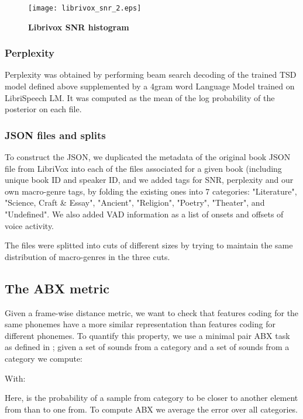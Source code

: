 \documentclass{article}
\begin{document}
\begin{figure}[h]
  \centering
  \centerline{\texttt{[image: librivox\_snr\_2.eps]}}
  \vspace{-1.3mm}
\caption{\textbf{Librivox SNR histogram}}
\label{fig:librivox_snr}
\end{figure}

\subsubsection{Perplexity}\label{sec:perplex}
Perplexity was obtained by performing beam search decoding of the trained TSD model defined above supplemented by a 4gram word Language Model trained on LibriSpeech LM. It was computed as the mean of the log probability of the posterior on each file. 

\subsubsection{JSON files and splits}\label{sec:json}

To construct the JSON, we duplicated the metadata of the original book JSON file from LibriVox into each of the files associated for a given book (including unique book ID and speaker ID, and we added tags for SNR, perplexity and our own macro-genre tags, by folding the existing ones into 7 categories: "Literature", "Science, Craft \& Essay", "Ancient", "Religion", "Poetry", "Theater", and "Undefined". We also added VAD information as a list of onsets and offsets of voice activity.

The files were splitted into cuts of different sizes by trying to maintain the same distribution of macro-genres in the three cuts. 

\subsection{The ABX metric}

Given a frame-wise distance metric, we want to check that features coding for the same phonemes have a more similar representation than features coding for different phonemes.
To quantify this property, we use a minimal pair ABX task as defined in \cite{Schatz2013ABX}; given a set of sounds  from a category  and a set of sounds  from a category  we compute:



With:



Here,  is the probability of a sample from category  to be closer to another element from  than to one from.
To compute ABX we average the error  over all categories.
\end{document}

